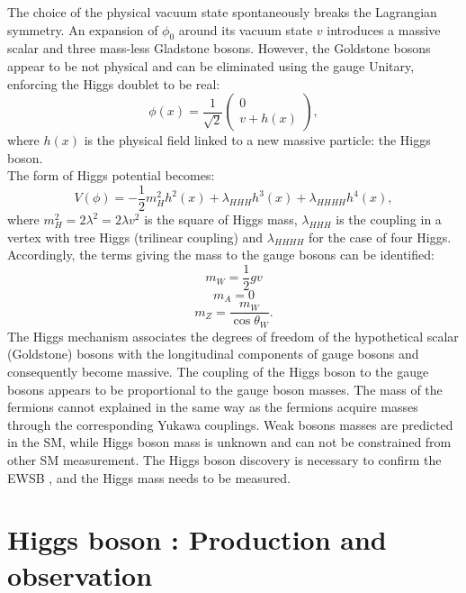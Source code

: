 The choice of the physical vacuum state spontaneously breaks the Lagrangian symmetry. An expansion of $\phi_0$ around its vacuum state $v$ introduces a massive scalar and three mass-less Gladstone bosons. However, the Goldstone bosons appear to be not physical and can be eliminated using the gauge Unitary, enforcing the Higgs doublet to be real:
\begin{equation}
    \phi(x)=\frac{1}{\sqrt{2}}\left(\begin{array}{c}
0 \\
v+h(x)
\end{array}\right),
\end{equation}
where $h(x)$ is the physical field linked to a new massive particle: the Higgs boson. \\
The form of Higgs potential becomes: 
\begin{equation}
    V(\phi)=-\frac{1}{2} m_{H}^{2} h^{2}(x)+\lambda_{H H H} h^{3}(x)+\lambda_{H H H H} h^{4}(x),
\end{equation}
where $m_{H}^{2}=2 \lambda^{2}=2 \lambda v^{2}$ is the square of Higgs mass, $\lambda_{HHH}$ is the coupling in a vertex with tree Higgs (trilinear coupling) and $\lambda_{HHHH}$ for the case of four Higgs.
Accordingly, the terms giving the mass to the gauge bosons can be identified:
\begin{equation}
m_{W} = \frac{1}{2}gv 
\end{equation}
\begin{equation}
m_{A} = 0    
\end{equation}
\begin{equation}
m_{Z} = \frac{m_{W}}{\cos\theta_{W}}.
\end{equation}
The Higgs mechanism associates the degrees of freedom of the hypothetical scalar (Goldstone) bosons with the longitudinal components of gauge bosons and consequently become massive. The coupling of the Higgs boson to the gauge bosons appears to be proportional to the gauge boson masses. The mass of the fermions cannot explained in the same way as the fermions acquire masses through the corresponding Yukawa couplings. Weak bosons masses are predicted in the SM, while Higgs boson mass is unknown and can not be constrained from other SM measurement. The Higgs boson discovery is necessary to confirm the EWSB \cite{EWSB}, and the Higgs mass needs to be measured.

\section{Higgs boson : Production and observation}
\label{chap1:H2012}

